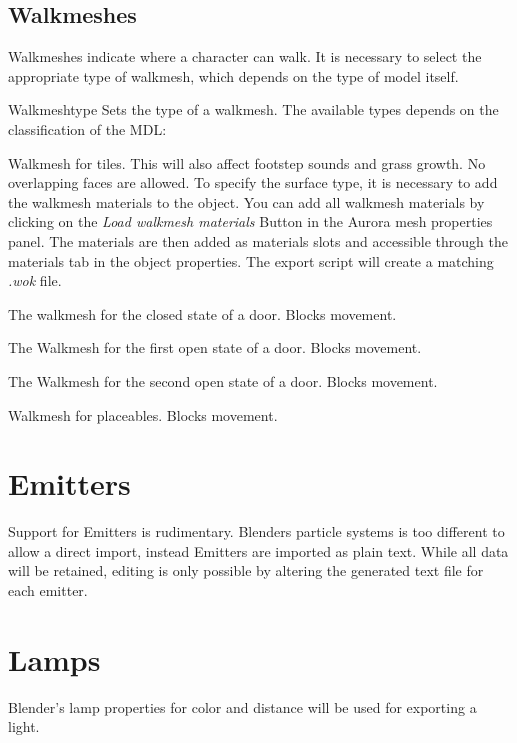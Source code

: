 \subsection{Walkmeshes}
Walkmeshes indicate where a character can walk. It is necessary to select 
the appropriate type of walkmesh, which depends on the type of model itself. 

\begin{propertyAurora}{Walkmeshtype} 
Sets the type of a walkmesh. The available types depends on the classification of the MDL:
\begin{description}[leftmargin=10em,style=nextline]
    \item[Tileset] Walkmesh for tiles. This will also affect footstep sounds and grass growth. No overlapping faces are allowed. To specify the surface type, it is necessary to add the walkmesh materials to the object. You can add all walkmesh materials by clicking on the {\textit{Load walkmesh materials}} Button in the Aurora mesh properties panel. The materials are then added as materials slots and accessible through the materials tab in the object properties.
    The export script will create a matching {\textit{.wok}} file. 
    \item[Door: Closed] The walkmesh for the closed state of a door. Blocks movement.
    \item[Door: Open 1] The Walkmesh for the first open state of a door. Blocks movement.
    \item[Door: Open 2] The Walkmesh for the second open state of a door. Blocks movement.
    \item[Placeable] Walkmesh for placeables. Blocks movement.
\end{description}
\end{propertyAurora}

\section{Emitters}
Support for Emitters is rudimentary. Blenders particle systems is too
different to allow a direct import, instead Emitters are imported as plain
text. While all data will be retained, editing is only possible by altering the 
generated text file for each emitter.

\section{Lamps}
Blender's lamp properties for color and distance will be used for exporting a light.

